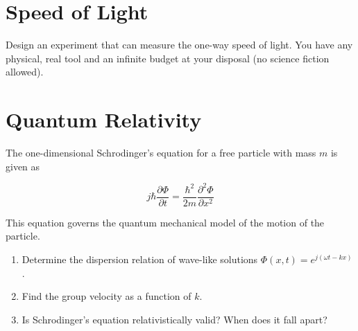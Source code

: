 \documentclass{article}
\begin{document}
\section{Speed of Light}

Design an experiment that can measure the one-way speed of light. You have any physical, real tool and an infinite budget at your disposal (no science fiction allowed).

\section{Quantum Relativity}

The one-dimensional Schrodinger's equation for a free particle with mass $m$ is given as

$$j \hbar \frac{\partial \Phi}{\partial t} = \frac{\hbar^2}{2m} \frac{\partial^2 \Phi}{\partial x^2}$$

This equation governs the quantum mechanical model of the motion of the particle.

\begin{enumerate}[label=(\alph*)]
    \item Determine the dispersion relation of wave-like solutions $\Phi(x, t) = e^{j(\omega t - kx)}$.

    \item Find the group velocity as a function of $k$.

    \item Is Schrodinger's equation relativistically valid? When does it fall apart?
\end{enumerate}
\end{document}
